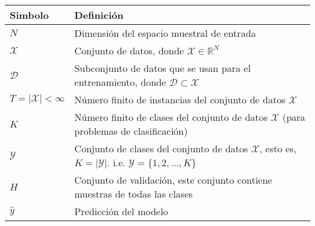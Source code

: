 \begin{table}[H]
    \begin{center}
        \begin{tabularx}{\textwidth}{|l|X|}
            \hline
            \textbf{Simbolo}                           & \textbf{Definición}                                                                                                                                                            \\
            \hline %
            $ N $                                      & Dimensión del espacio muestral de entrada                                                                                                                                      \\
            $ \mathcal{X} $                            & Conjunto de datos, donde $\mathcal{X} \in \mathbb{R}^{N}$                                                                                                                      \\
            $ \mathcal{D} $                            & Subconjunto de datos que se usan para el entrenamiento, donde $\mathcal{D} \subset \mathcal{X}$                                                                                \\
            $ T = \lvert \mathcal{X} \rvert < \infty $ & Número finito de instancias del conjunto de datos $\mathcal{X}$                                                                                                                \\
            $ K $                                      & Número finito de clases del conjunto de datos $\mathcal{X}$ (para problemas de clasificación)                                                                                  \\
            $ \mathcal{Y} $                            & Conjunto de clases del conjunto de datos $\mathcal{X}$, esto es, $\textit{K} = \lvert \mathcal{Y} \rvert$. \newline i.e. ${\scriptstyle \mathcal{Y} = \{1,2,...,\textit{K}\}}$ \\
            $ H $                                      & Conjunto de validación, este conjunto contiene muestras de todas las clases                                                                                                    \\
            $ \hat{y} $                                & Predicción del modelo                                                                                                                                                          \\

\end{tabularx}
\end{center}
\end{table}
